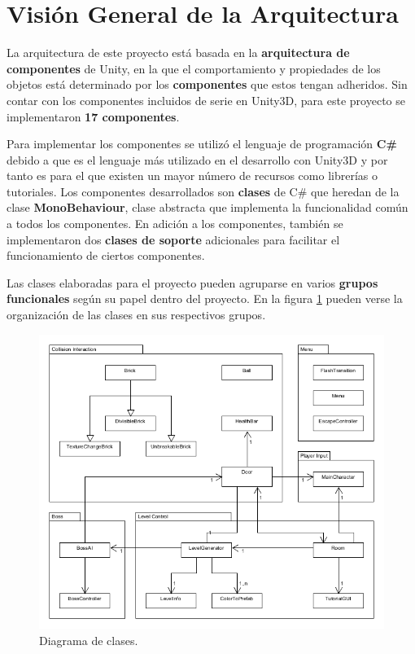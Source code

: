 \section{Visión General de la Arquitectura}
La arquitectura de este proyecto está basada en la \textbf{arquitectura de componentes} de Unity, en la que el comportamiento y propiedades de los objetos está determinado por los \textbf{componentes} que estos tengan adheridos. Sin contar con los componentes incluidos de serie en Unity3D, para este proyecto se implementaron \textbf{17 componentes}.

Para implementar los componentes se utilizó el lenguaje de programación \textbf{C\#} debido a que es el lenguaje más utilizado en el desarrollo con Unity3D y por tanto es para el que existen un mayor número de recursos como librerías o tutoriales. Los componentes desarrollados son \textbf{clases} de C\# que heredan de la clase \textbf{MonoBehaviour}, clase abstracta que implementa la funcionalidad común a todos los componentes. En adición a los componentes, también se implementaron dos \textbf{clases de soporte} adicionales para facilitar el funcionamiento de ciertos componentes.

Las clases elaboradas para el proyecto pueden agruparse en varios \textbf{grupos funcionales} según su papel dentro del proyecto. En la figura \ref{diagrama_clases} pueden verse la organización de las clases en sus respectivos grupos.
\begin{figure}[!t]
    \centering
    \includegraphics[width=1\textwidth]{images/estructura/vision/diagram}
    \caption{Diagrama de clases.}
    \label{diagrama_clases}
\end{figure}

